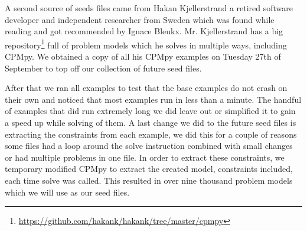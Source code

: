 A second source of seeds files came from Hakan Kjellerstrand a retired software developer and independent researcher from Sweden which was found while reading \cite{18bleukx2022model} and got recommended by Ignace Bleukx. Mr. Kjellerstrand has a big repository\footnote{\url{https://github.com/hakank/hakank/tree/master/cpmpy}} full of problem models which he solves in multiple ways, including CPMpy. We obtained a copy of all his CPMpy examples on Tuesday 27th of September to top off our collection of future seed files.


After that we ran all examples to test that the base examples do not crash on their own and noticed that most examples run in less than a minute. The handful of examples that did run extremely long we did leave out or simplified it to gain a speed up while solving of them. A last change we did to the future seed files is extracting the constraints from each example, we did this for a couple of reasons some files had a loop around the solve instruction combined with small changes or had multiple problems in one file. In order to extract these constraints, we temporary modified CPMpy to extract the created model, constraints included, each time solve was called. This resulted in over nine thousand problem models which we will use as our seed files.



